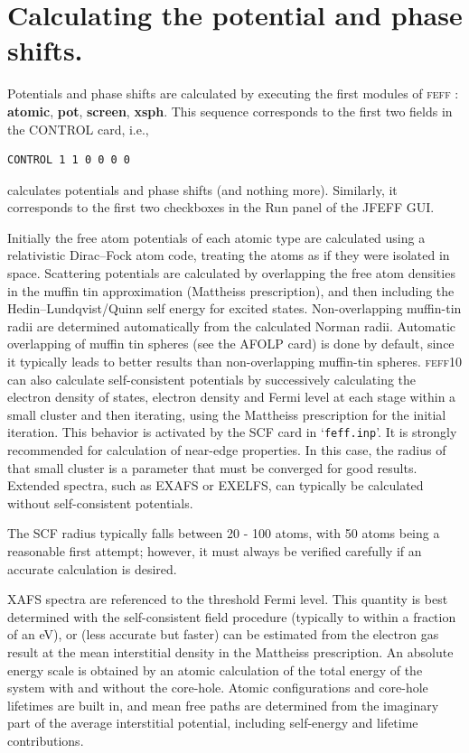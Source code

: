 \documentclass[11pt,oneside]{report} %
\newcommand{\program}[1]{\textsc{#1}}
\newcommand{\feff}{\program{feff}}
\newcommand{\vnum}{10}
\newcommand{\feffcur}{\feff\vnum}
\newcommand{\file}[1]{`\texttt{#1}'}
\newcommand{\module}[1]{\textrm{\bf{#1}}}
\begin{document}
\section{Calculating the potential and phase shifts.}
\label{sec:calcpots}
Potentials and phase shifts are calculated by executing the first modules of
{\feff} : \module{atomic}, \module{pot}, \module{screen}, \module{xsph}.  This
sequence corresponds to the first two fields in the CONTROL card, i.e.,
\begin{verbatim}
CONTROL 1 1 0 0 0 0 
\end{verbatim}
calculates potentials and phase shifts (and nothing more).  Similarly, it corresponds to the first two checkboxes in the Run panel of the JFEFF GUI.

Initially the free atom potentials of each atomic type are calculated
using a relativistic Dirac--Fock atom code, treating the atoms as if
they were isolated in space. Scattering potentials are
calculated by overlapping the free atom densities in the muffin tin
approximation (Mattheiss prescription), and then including the
Hedin--Lundqvist/Quinn self energy for excited states. 
Non-overlapping muffin-tin radii are determined automatically from
the calculated Norman radii. Automatic overlapping of muffin tin
spheres (see the AFOLP card) is done by default, since it typically
leads to better results than non-overlapping muffin-tin spheres.
{\feffcur} can also calculate self-consistent potentials by successively
calculating the electron density of states, electron density and Fermi
level at each stage within a small cluster and then iterating, using
the Mattheiss prescription for the initial iteration.  This behavior is activated by the SCF card in \file{feff.inp}.  
It is strongly recommended for calculation of near-edge properties.  In this case, the radius
of that small cluster is a parameter that must be converged for good results.  Extended spectra, such as EXAFS or EXELFS,
can typically be calculated without self-consistent potentials.

The SCF radius typically falls between 20 - 100 atoms, with 50 atoms being a reasonable first attempt; however, it must always be verified carefully if an accurate calculation is desired.

XAFS spectra are referenced to the threshold Fermi level. This
quantity is best determined with the self-consistent field procedure 
(typically to within a fraction of an eV), 
or (less accurate but faster) can be estimated from the electron
gas result at the mean interstitial density in the Mattheiss prescription. 
An absolute energy scale is obtained by an atomic
calculation of the total energy of the system with and without the
core-hole. Atomic configurations and core-hole lifetimes are built
in, and mean free paths are determined from the imaginary part of the
average interstitial potential, including self-energy and lifetime
contributions.
\end{document}

